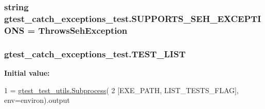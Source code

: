 \subsubsection[{\texorpdfstring{S\+U\+P\+P\+O\+R\+T\+S\+\_\+\+S\+E\+H\+\_\+\+E\+X\+C\+E\+P\+T\+I\+O\+NS}{SUPPORTS_SEH_EXCEPTIONS}}]{\setlength{\rightskip}{0pt plus 5cm}string gtest\+\_\+catch\+\_\+exceptions\+\_\+test.\+S\+U\+P\+P\+O\+R\+T\+S\+\_\+\+S\+E\+H\+\_\+\+E\+X\+C\+E\+P\+T\+I\+O\+NS = \textquotesingle{}Throws\+Seh\+Exception\textquotesingle{}}\hypertarget{namespacegtest__catch__exceptions__test_a237f68d721da53e9fd4f83b07a1887e3}{}\label{namespacegtest__catch__exceptions__test_a237f68d721da53e9fd4f83b07a1887e3}
\subsubsection[{\texorpdfstring{T\+E\+S\+T\+\_\+\+L\+I\+ST}{TEST_LIST}}]{\setlength{\rightskip}{0pt plus 5cm}gtest\+\_\+catch\+\_\+exceptions\+\_\+test.\+T\+E\+S\+T\+\_\+\+L\+I\+ST}\hypertarget{namespacegtest__catch__exceptions__test_ac0cf90f54624335d1765e85cf6a74e21}{}\label{namespacegtest__catch__exceptions__test_ac0cf90f54624335d1765e85cf6a74e21}
{\bfseries Initial value\+:}
\begin{DoxyCode}
1 = \hyperlink{classgtest__test__utils_1_1Subprocess}{gtest\_test\_utils.Subprocess}(
2     [EXE\_PATH, LIST\_TESTS\_FLAG], env=environ).output
\end{DoxyCode}
